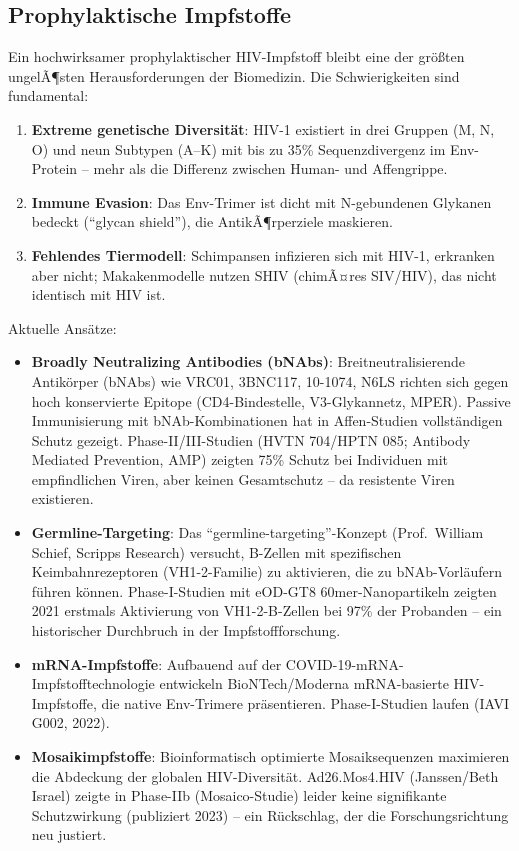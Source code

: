 ﻿\documentclass[a4paper,12pt]{article}
\theoremstyle{definition}
\begin{document}
\subsection{Prophylaktische Impfstoffe}

Ein hochwirksamer prophylaktischer HIV-Impfstoff bleibt eine der gr\"o\ss ten
ungelÃ¶sten Herausforderungen der Biomedizin. Die Schwierigkeiten sind fundamental:
\begin{enumerate}
\item \textbf{Extreme genetische Diversit\"at}: HIV-1 existiert in drei Gruppen
      (M, N, O) und neun Subtypen (A--K) mit bis zu 35\% Sequenzdivergenz im
      Env-Protein -- mehr als die Differenz zwischen Human- und Affengrippe.
\item \textbf{Immune Evasion}: Das Env-Trimer ist dicht mit N-gebundenen Glykanen
      bedeckt (``glycan shield''), die AntikÃ¶rperziele maskieren.
\item \textbf{Fehlendes Tiermodell}: Schimpansen infizieren sich mit HIV-1,
      erkranken aber nicht; Makakenmodelle nutzen SHIV (chimÃ¤res SIV/HIV),
      das nicht identisch mit HIV ist.
\end{enumerate}

Aktuelle Ans\"atze:
\begin{itemize}
\item \textbf{Broadly Neutralizing Antibodies (bNAbs)}: Breitneutralisierende
      Antik\"orper (bNAbs) wie VRC01, 3BNC117, 10-1074, N6LS richten sich gegen
      hoch konservierte Epitope (CD4-Bindestelle, V3-Glykannetz, MPER).
      Passive Immunisierung mit bNAb-Kombinationen hat in Affen-Studien vollst\"andigen
      Schutz gezeigt. Phase-II/III-Studien (HVTN 704/HPTN 085; Antibody Mediated
      Prevention, AMP) zeigten 75\% Schutz bei Individuen mit empfindlichen Viren,
      aber keinen Gesamtschutz -- da resistente Viren existieren.

\item \textbf{Germline-Targeting}: Das ``germline-targeting''-Konzept (Prof.\ William Schief,
      Scripps Research) versucht, B-Zellen mit spezifischen Keimbahnrezeptoren
      (VH1-2-Familie) zu aktivieren, die zu bNAb-Vorl\"aufern f\"uhren k\"onnen.
      Phase-I-Studien mit eOD-GT8 60mer-Nanopartikeln zeigten 2021 erstmals
      Aktivierung von VH1-2-B-Zellen bei 97\% der Probanden -- ein historischer
      Durchbruch in der Impfstoffforschung.

\item \textbf{mRNA-Impfstoffe}: Aufbauend auf der COVID-19-mRNA-Impfstofftechnologie
      entwickeln BioNTech/Moderna mRNA-basierte HIV-Impfstoffe, die native Env-Trimere
      pr\"asentieren. Phase-I-Studien laufen (IAVI G002, 2022).

\item \textbf{Mosaikimpfstoffe}: Bioinformatisch optimierte Mosaiksequenzen maximieren
      die Abdeckung der globalen HIV-Diversit\"at. Ad26.Mos4.HIV (Janssen/Beth Israel)
      zeigte in Phase-IIb (Mosaico-Studie) leider keine signifikante Schutzwirkung
      (publiziert 2023) -- ein R\"uckschlag, der die Forschungsrichtung neu justiert.
\end{itemize}
\end{document}
